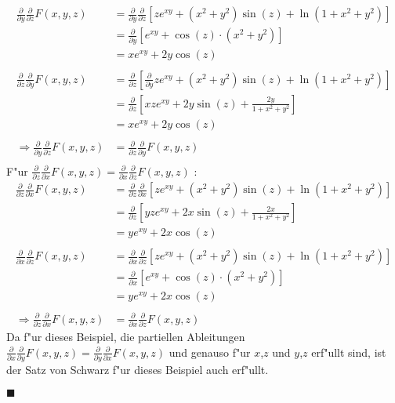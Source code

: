\documentclass{theozettel}
\begin{document}
\begin{align*}
\frac{\partial}{\partial y}\frac{\partial}{\partial z}F\left(x,y,z\right) &= \frac{\partial}{\partial y}\frac{\partial}{\partial z}\left[ze^{xy}+\left(x^2+y^2\right)\sin\left(z\right)+\ln\left(1+x^2+y^2\right)\right]\\
&=\frac{\partial}{\partial y}\left[e^{xy}+\cos\left(z\right)\cdot\left( x^2+y^2\right)\right]\\
&= xe^{xy}+2y\cos\left(z\right)\\\\
\frac{\partial}{\partial z}\frac{\partial}{\partial y}F\left(x,y,z\right)&= \frac{\partial}{\partial z}\left[\frac{\partial}{\partial y}ze^{xy}+\left(x^2+y^2\right)\sin\left(z\right)+\ln\left(1+x^2+y^2\right)\right]\\
&= \frac{\partial}{\partial z}\left[xze^{xy}+2y\sin\left( z\right)+\frac{2y}{1+x^2+y^2}\right]\\
&= xe^{xy}+2y\cos\left(z\right)\\\\
\Rightarrow \frac{\partial}{\partial y}\frac{\partial}{\partial z}F\left(x,y,z\right) &=\frac{\partial}{\partial z}\frac{\partial}{\partial y}F\left(x,y,z\right)\\
\end{align*}
F"ur $\frac{\partial}{\partial z}\frac{\partial}{\partial x}F\left(x,y,z\right) =\frac{\partial}{\partial x}\frac{\partial}{\partial z}F\left(x,y,z\right)$ :
\begin{align*}
\frac{\partial}{\partial z}\frac{\partial}{\partial x}F\left(x,y,z\right) &= \frac{\partial}{\partial z}\frac{\partial}{\partial x}\left[ze^{xy}+\left(x^2+y^2\right)\sin\left(z\right)+\ln\left(1+x^2+y^2\right)\right]\\
&=\frac{\partial}{\partial z}\left[yze^{xy}+2x\sin\left(z\right)+\frac{2x}{1+x^2+y^2}\right]\\
&= ye^{xy}+2x\cos\left(z\right)\\\\
\frac{\partial}{\partial x}\frac{\partial}{\partial z}F\left(x,y,z\right)&= \frac{\partial}{\partial x}\frac{\partial}{\partial z}\left[ze^{xy}+\left(x^2+y^2\right)\sin\left(z\right)+\ln\left(1+x^2+y^2\right)\right]\\
&= \frac{\partial}{\partial x}\left[e^{xy}+\cos\left(z\right)\cdot\left(x^2+y^2\right)\right]\\
&= ye^{xy}+2x\cos\left(z\right)\\\\
\Rightarrow \frac{\partial}{\partial z}\frac{\partial}{\partial x}F\left(x,y,z\right) &=\frac{\partial}{\partial x}\frac{\partial}{\partial z}F\left(x,y,z\right)
\end{align*}
Da f"ur dieses Beispiel, die partiellen Ableitungen $\frac{\partial}{\partial x}\frac{\partial}{\partial y}F\left(x,y,z\right) =\frac{\partial}{\partial y}\frac{\partial}{\partial x}F\left(x,y,z\right)$ und genauso f"ur $x$,$z$ und $y$,$z$ erf"ullt sind, ist der Satz von Schwarz f"ur dieses Beispiel auch erf"ullt.
\begin{flushright}
$\blacksquare$
\end{flushright}
\end{document}
